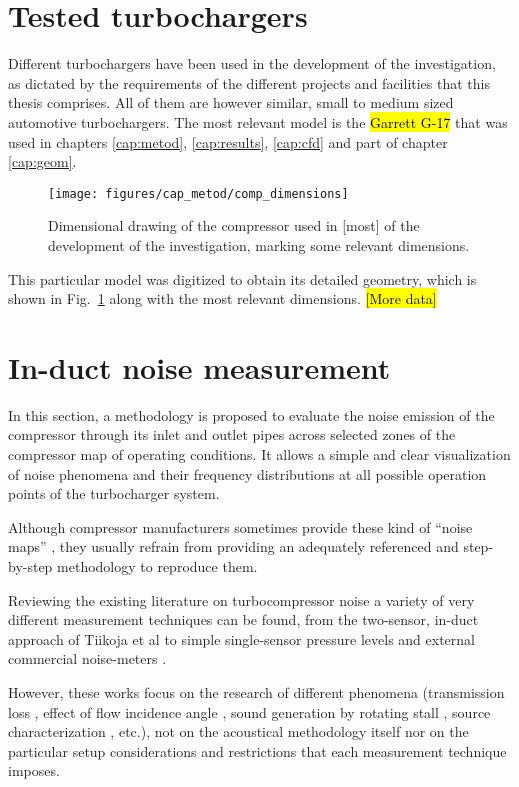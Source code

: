\section{Tested turbochargers}

Different turbochargers have been used in the development of the investigation, as dictated by the requirements of the different projects and facilities that this thesis comprises. All of them are however similar, small to medium sized automotive turbochargers. The most relevant model is the \hl{Garrett G-17} that was used in chapters \ref{cap:metod}, \ref{cap:results}, \ref{cap:cfd} and part of chapter \ref{cap:geom}. 

\begin{figure}[h!]
\centering
\texttt{[image: figures/cap\_metod/comp\_dimensions]}
\caption{Dimensional drawing of the compressor used in [most] of the development of the investigation, marking some relevant dimensions.}
\label{fig:comp_dimens}
\end{figure}

This particular model was digitized to obtain its detailed geometry, which is shown in Fig.~\ref{fig:comp_dimens} along with the most relevant dimensions. \hl{[More data]}

\section{In-duct noise measurement} %

In this section, a methodology is proposed to evaluate the noise emission of the compressor through its inlet and outlet pipes across selected zones of the compressor map of operating conditions. It allows a simple and clear visualization of noise phenomena and their frequency distributions at all possible operation points of the turbocharger system.

Although compressor manufacturers sometimes provide these kind of ``noise maps'' \cite{gaude2008experimental}, they usually refrain from providing an adequately referenced and step-by-step methodology to reproduce them.

Reviewing the existing literature on turbocompressor noise a variety of very different measurement techniques can be found, from the two-sensor, in-duct approach of Tiikoja et al \cite{tiikoja2011inves} to simple single-sensor pressure levels and external commercial noise-meters \cite{figurella2012noise}.

However, these works focus on the research of different phenomena (transmission loss \cite{tiikoja2011inves}, effect of flow incidence angle \cite{figurella2012noise}, sound generation by rotating stall \cite{mongeau1993sound}, source characterization \cite{mongeau1995method}, etc.), not on the acoustical methodology itself nor on the particular setup considerations and restrictions that each measurement technique imposes.

